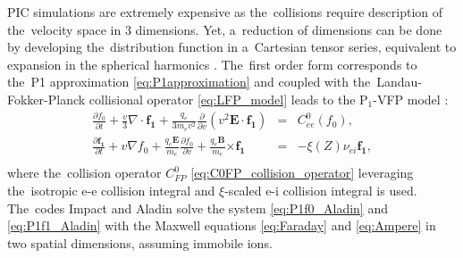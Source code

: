 \documentclass[
 aps,
 jmp,
 amsmath,amssymb,
 twocolumn,
]{revtex4-1}
\newcommand{\vect}[1]{\boldsymbol{#1}}
\newcommand{\dI}{\text{d}}
\newcommand{\Zbar}{Z}
\newcommand{\nuei}{\nu_{ei}}
\newcommand{\vmag}{v}
\newcommand{\E}{\vect{E}}
\newcommand{\B}{\vect{B}}
\newcommand{\qe}{q_e}
\newcommand{\me}{m_e}
\newcommand{\fzero}{f_0}
\newcommand{\fone}{{\vect{f_1}}}
\newcommand{\corrMH}[1]{ {\color{red} #1} }
\begin{document}
PIC simulations are extremely expensive as the~collisions require description 
of the~velocity space in 3 dimensions. Yet, a~reduction of dimensions can be 
done by developing the~distribution function in a~Cartesian tensor series, 
equivalent to expansion in the spherical harmonics \cite{Johnston_PR1960}.
The~first order form corresponds to the~P1 approximation 
\eqref{eq:P1approximation} and coupled with
the~Landau-Fokker-Planck collisional operator 
\eqref{eq:LFP_model} leads to the P$_1$-VFP model 
\cite{Johnston_PR1960, Kingham_JCP2004, CEA-Aladin}:
\begin{eqnarray}
\frac{\partial \fzero}{\partial t}+\frac{\vmag}{3}\nabla \cdot \fone
+\frac{\qe}{3\me\vmag^2}\frac{\partial}{\partial \vmag}(\vmag^2\E\cdot \fone)
&=&
C^0_{ee}(\fzero) ,
 \label{eq:P1f0_Aladin}\\
\frac{\partial \fone}{\partial t}+\vmag\nabla \fzero
+ \frac{\qe\E}{\me}\frac{\partial \fzero}{\partial \vmag}
+\frac{\qe\B}{\me}\vect{\times} \fone 
&=&
- \xi(\Zbar)\nuei\fone ,
\nonumber\\
&&\label{eq:P1f1_Aladin}
\end{eqnarray}
\corrMH{
where the~collision operator $C^0_{FP}$ \eqref{eq:C0FP_collision_operator} leveraging the~isotropic e-e collision integral and $\xi$-scaled e-i 
collision integral is used.
}
The~codes Impact \cite{Kingham_JCP2004} and Aladin \cite{CEA-Aladin} 
solve the system \eqref{eq:P1f0_Aladin} 
and \eqref{eq:P1f1_Aladin} with the Maxwell equations  
\eqref{eq:Faraday} and \eqref{eq:Ampere} in two spatial dimensions, 
assuming immobile ions.


\end{document}
